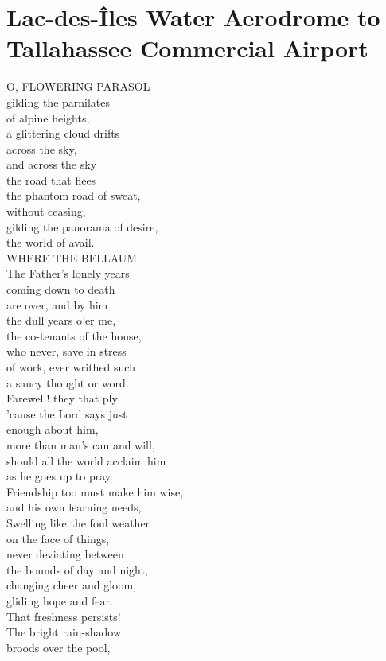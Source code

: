 \documentclass[smalldemyvopaper,11pt,twoside,onecolumn,openright,extrafontsizes]{memoir}
\begin{document}
\chapter{Lac-des-Îles Water Aerodrome to Tallahassee Commercial Airport}
O, FLOWERING PARASOL
\\gilding the parnilates
\\of alpine heights,
\\a glittering cloud drifts
\\across the sky,
\\and across the sky
\\the road that flees
\\the phantom road of sweat,
\\without ceasing,
\\gilding the panorama of desire,
\\the world of avail.
\\WHERE THE BELLAUM
\\The Father's lonely years
\\coming down to death
\\are over, and by him
\\the dull years o'er me,
\\the co-tenants of the house,
\\who never, save in stress
\\of work, ever writhed such
\\a saucy thought or word.
\\Farewell! they that ply
\\'cause the Lord says just
\\enough about him,
\\more than man's can and will,
\\should all the world acclaim him
\\as he goes up to pray.
\\Friendship too must make him wise,
\\and his own learning needs,
\\Swelling like the foul weather
\\on the face of things,
\\never deviating between
\\the bounds of day and night,
\\changing cheer and gloom,
\\gliding hope and fear.
\\That freshness persists!
\\The bright rain-shadow
\\broods over the pool,
\end{document}
